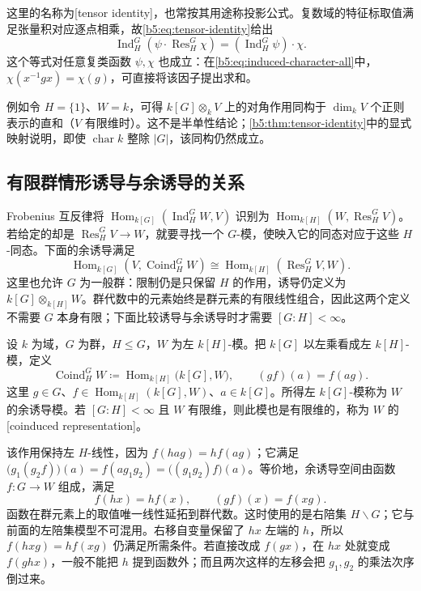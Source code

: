 这里的名称为[tensor identity]，也常按其用途称投影公式。复数域的特征标取值满足张量积对应逐点相乘，故\eqref{b5:eq:tensor-identity}给出
\[
	\operatorname{Ind}_H^G\left(\psi\cdot\operatorname{Res}_H^G\chi\right) =(\operatorname{Ind}_H^G\psi)\cdot\chi.
\]
这个等式对任意复类函数 \(\psi,\chi\) 也成立：在\eqref{b5:eq:induced-character-all}中，\(\chi(x^{-1}gx)=\chi(g)\)，可直接将该因子提出求和。

\ProseParagraphBreak
例如令 \(H=\{1\}\)、\(W=k\)，可得 \(k[G]\otimes_k V\) 上的对角作用同构于 \(\dim_k V\) 个正则表示的直和（\(V\) 有限维时）。这不是半单性结论；\cref{b5:thm:tensor-identity}中的显式映射说明，即使 \(\operatorname{char}k\) 整除 \(|G|\)，该同构仍然成立。

\subsection{有限群情形诱导与余诱导的关系}
\label{b5:subsec:0304:03}

Frobenius 互反律将 \(\operatorname{Hom}_{k[G]}(\operatorname{Ind}_H^G W,V)\) 识别为 \(\operatorname{Hom}_{k[H]}(W,\operatorname{Res}_H^G V)\)。若给定的却是 \(\operatorname{Res}_H^G V\rightarrow W\)，就要寻找一个 \(G\)-模，使映入它的同态对应于这些 \(H\)-同态。下面的余诱导满足
\[
	\operatorname{Hom}_{k[G]}(V,\operatorname{Coind}_H^G W) \cong\operatorname{Hom}_{k[H]}(\operatorname{Res}_H^G V,W).
\]
这里也允许 \(G\) 为一般群：限制仍是只保留 \(H\) 的作用，诱导仍定义为 \(k[G]\otimes_{k[H]}W\)。群代数中的元素始终是群元素的有限线性组合，因此这两个定义不需要 \(G\) 本身有限；下面比较诱导与余诱导时才需要 \([G:H]<\infty\)。

\begin{definition}\label{b5:def:coinduction}
	设 \(k\) 为域，\(G\) 为群，\(H\le G\)，\(W\) 为左 \(k[H]\)-模。把 \(k[G]\) 以左乘看成左 \(k[H]\)-模，定义
	\[
		\operatorname{Coind}_H^G W \coloneqq\operatorname{Hom}_{k[H]}\bigl(k[G],W\bigr), \qquad (gf)(a)=f(ag).
	\]
	这里 \(g\in G\)、\(f\in\operatorname{Hom}_{k[H]}(k[G],W)\)、\(a\in k[G]\)。所得左 \(k[G]\)-模称为 \(W\) 的余诱导模。若 \([G:H]<\infty\) 且 \(W\) 有限维，则此模也是有限维的，称为 \(W\) 的[coinduced representation]。
\end{definition}

该作用保持左 \(H\)-线性，因为 \(f(hag)=hf(ag)\)；它满足 \(\bigl(g_1(g_2f)\bigr)(a)=f(ag_1g_2)=\bigl((g_1g_2)f\bigr)(a)\)。等价地，余诱导空间由函数 \(f:G\rightarrow W\) 组成，满足
\begin{equation}\label{b5:eq:coinduced-functions}
	f(hx)=hf(x),\qquad (gf)(x)=f(xg).
\end{equation}
函数在群元素上的取值唯一线性延拓到群代数。这时使用的是右陪集 \(H\backslash G\)；它与前面的左陪集模型不可混用。右移自变量保留了 \(hx\) 左端的 \(h\)，所以 \(f(hxg)=hf(xg)\) 仍满足所需条件。若直接改成 \(f(gx)\)，在 \(hx\) 处就变成 \(f(ghx)\)，一般不能把 \(h\) 提到函数外；而且两次这样的左移会把 \(g_1,g_2\) 的乘法次序倒过来。

